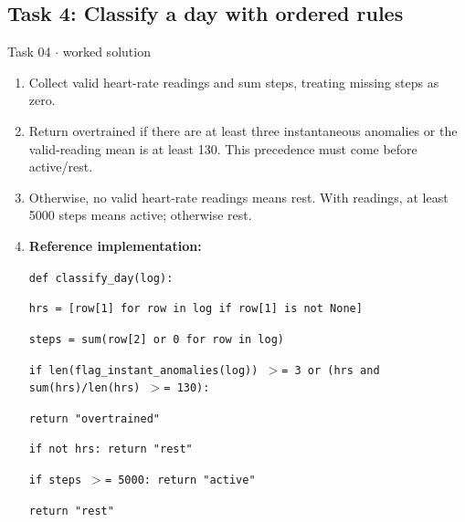 \documentclass[11pt]{article}
\begin{document}
\begin{keepsection}\subsection{Task 4: Classify a day with ordered rules}

\begin{workedbox}{Task 04 \ensuremath{\cdot} worked solution}
\begin{enumerate}
\item Collect valid heart-rate readings and sum steps, treating missing steps as zero.
\item Return overtrained if there are at least three instantaneous anomalies or the valid-reading mean is at least 130. This precedence must come before active/rest.
\item Otherwise, no valid heart-rate readings means rest. With readings, at least 5000 steps means active; otherwise rest.
\item {}
\textbf{Reference implementation:}
\begin{tcolorbox}[colback=Paperblue,colframe=Paperblue,boxrule=0pt,arc=0pt,left=7pt,right=7pt,top=5pt,bottom=5pt]\small\sloppy
\noindent\hspace*{0em}\texttt{def classify\_day(log):}\par
\noindent\hspace*{1em}\texttt{hrs = [row[1] for row in log if row[1] is not None]}\par
\noindent\hspace*{1em}\texttt{steps = sum(row[2] or 0 for row in log)}\par
\noindent\hspace*{1em}\texttt{if len(flag\_instant\_anomalies(log)) \ensuremath{>}= 3 or (hrs and sum(hrs)/len(hrs) \ensuremath{>}= 130):}\par
\noindent\hspace*{3em}\texttt{return "overtrained"}\par
\noindent\hspace*{1em}\texttt{if not hrs: return "rest"}\par
\noindent\hspace*{1em}\texttt{if steps \ensuremath{>}= 5000: return "active"}\par
\noindent\hspace*{1em}\texttt{return "rest"}\par
\end{tcolorbox}
\end{enumerate}
\end{workedbox}

\end{keepsection}
\end{document}

